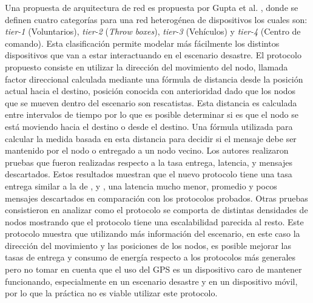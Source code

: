 Una propuesta de arquitectura de red es propuesta por Gupta et al. \cite{Gupta2015},
donde se definen cuatro categorías para una red heterogénea de dispositivos los
cuales son: \textit{tier-1} (Voluntarios), \textit{tier-2} (\textit{Throw
boxes}), \textit{tier-3} (Vehículos) y \textit{tier-4} (Centro de comando).
Esta clasificación permite modelar más fácilmente los distintos dispositivos que
van a estar interactuando en el escenario desastre.  El protocolo propuesto
consiste en utilizar la dirección del movimiento del nodo, llamada factor
direccional calculada mediante una fórmula de distancia desde la posición actual
hacia el destino, posición conocida con anterioridad dado que los nodos que se
mueven dentro del escenario son rescatistas. Esta distancia es calculada entre
intervalos de tiempo por lo que es posible determinar si es que el nodo se está
moviendo hacia el destino o desde el destino. Una fórmula utilizada para
calcular la medida basada en esta distancia para decidir si el mensaje debe ser
mantenido por el nodo o entregado a un nodo vecino. Los autores realizaron
pruebas que fueron realizadas respecto a la tasa entrega, latencia, \overhead{} y
mensajes descartados. Estos resultados muestran que el nuevo protocolo tiene una
tasa entrega similar a la de \maxprop, \rapid{} y \ebr, una latencia mucho menor,
\overhead{} promedio y pocos mensajes descartados en comparación con los
protocolos probados. Otras pruebas consistieron en analizar como el protocolo se
comporta de distintas densidades de nodos mostrando que el protocolo tiene una
escalabilidad parecida al resto.  Este protocolo muestra que utilizando más
información del escenario, en este caso la dirección del movimiento y las
posiciones de los nodos, es posible mejorar las tasas de entrega y consumo de
energía respecto a los protocolos más generales pero no tomar en cuenta que el
uso del GPS es un dispositivo caro de mantener funcionando, especialmente en un
escenario desastre y en un dispositivo móvil, por lo que la práctica no es
viable utilizar este protocolo.


